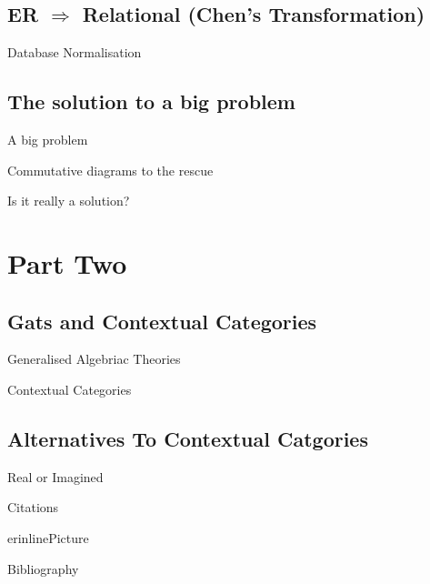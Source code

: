 \documentclass{beamer}
\renewcommand{\erpictureFolder}[0]{../SharedPictures}
\begin{document}
\subsection{ER $\Longrightarrow$ Relational (Chen's Transformation)}
\begin{frame}
\end{frame}
\begin{frame}{Database Normalisation}
\end{frame}

\subsection{The solution to a big problem}
\begin{frame}{A big problem}
\end{frame}
\begin{frame}{Commutative diagrams to the rescue}
\end{frame}
\begin{frame}{Is it really a solution?}
\end{frame}

\section{Part Two}
\subsection{Gats and Contextual Categories}
\begin{frame}{Generalised Algebriac Theories}
\end{frame}
\begin{frame}{Contextual Categories}
\end{frame}
\subsection{Alternatives To Contextual Catgories}
\begin{frame}{Real or Imagined}
\end{frame}

\begin{frame}{Citations}
\cite{Cartmell78}
\nocite{erhard88}
\end{frame}

\begin{frame}{erinlinePicture}

\end{frame}

\begin{frame}{Bibliography}

\end{frame}
\end{document}
